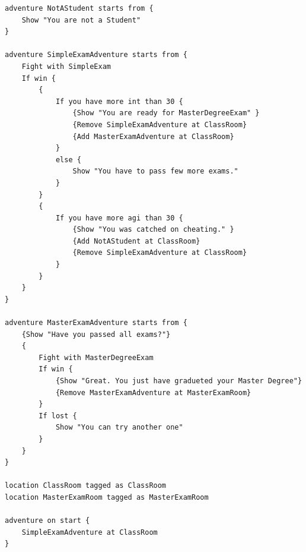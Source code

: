 \documentclass	{xmgr}
\begin{document}
\begin{lstlisting}
adventure NotAStudent starts from {
	Show "You are not a Student"
}

adventure SimpleExamAdventure starts from {
	Fight with SimpleExam
	If win {
		{
			If you have more int than 30 {
				{Show "You are ready for MasterDegreeExam" }
				{Remove SimpleExamAdventure at ClassRoom}
				{Add MasterExamAdventure at ClassRoom}
			}
			else {
				Show "You have to pass few more exams."
			}
		}
		{
			If you have more agi than 30 {
				{Show "You was catched on cheating." }
				{Add NotAStudent at ClassRoom}
				{Remove SimpleExamAdventure at ClassRoom}
			}
		}
	}
}

adventure MasterExamAdventure starts from {
	{Show "Have you passed all exams?"}
	{
		Fight with MasterDegreeExam
		If win {
			{Show "Great. You just have gradueted your Master Degree"}
			{Remove MasterExamAdventure at MasterExamRoom}
		}
		If lost {
			Show "You can try another one"
		}
	}
}

location ClassRoom tagged as ClassRoom
location MasterExamRoom tagged as MasterExamRoom

adventure on start {
	SimpleExamAdventure at ClassRoom
}

\end{lstlisting}




\listoftables

\listoffigures

\oswiadczenie
\end{document}
